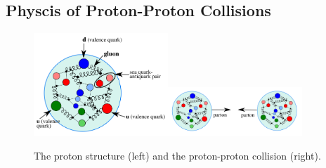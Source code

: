 \subsection{Physcis of Proton-Proton Collisions}

\begin{figure}[htb]
  \begin{center}
    {\includegraphics[width=0.45\textwidth]{../figs/Intro/protonStructure.png}\includegraphics[width=0.45\textwidth]{../figs/Intro/ppCollision.png}}
    \caption{The proton structure (left) and the proton-proton collision (right).}
    \label{fig:ppCollision}
  \end{center}
\end{figure}


